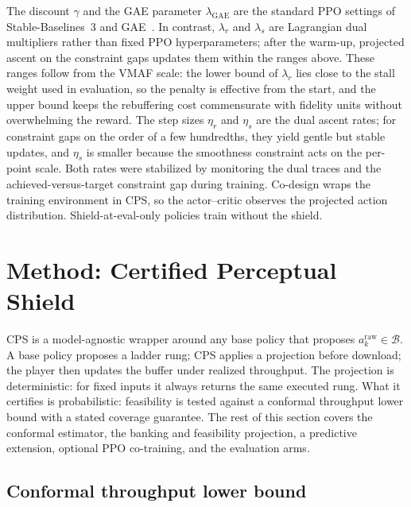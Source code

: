 The discount \(\gamma\) and the GAE parameter \(\lambda_{\mathrm{GAE}}\) are the standard PPO settings of Stable-Baselines~3 and GAE~\cite{schulman2017proximal,raffin2021sb3}.
In contrast, \(\lambda_r\) and \(\lambda_s\) are Lagrangian dual multipliers rather than fixed PPO hyperparameters; after the warm-up, projected ascent on the constraint gaps updates them within the ranges above.
These ranges follow from the VMAF scale: the lower bound of \(\lambda_r\) lies close to the stall weight used in evaluation, so the penalty is effective from the start, and the upper bound keeps the rebuffering cost commensurate with fidelity units without overwhelming the reward.
The step sizes \(\eta_r\) and \(\eta_s\) are the dual ascent rates; for constraint gaps on the order of a few hundredths, they yield gentle but stable updates, and \(\eta_s\) is smaller because the smoothness constraint acts on the per-point scale.
Both rates were stabilized by monitoring the dual traces and the achieved-versus-target constraint gap during training.
Co-design wraps the training environment in CPS, so the actor--critic observes the projected action distribution.
Shield-at-eval-only policies train without the shield.

\section{Method: Certified Perceptual Shield}
\label{sec:method}

CPS is a model-agnostic wrapper around any base policy that proposes \(a^{\mathrm{raw}}_k\in\mathcal{B}\).
A base policy proposes a ladder rung; CPS applies a projection before download; the player then updates the buffer under realized throughput.
The projection is deterministic: for fixed inputs it always returns the same executed rung.
What it certifies is probabilistic: feasibility is tested against a conformal throughput lower bound with a stated coverage guarantee.
The rest of this section covers the conformal estimator, the banking and feasibility projection, a predictive extension, optional PPO co-training, and the evaluation arms.

\subsection{Conformal throughput lower bound}
\label{sec:method:conformal}

